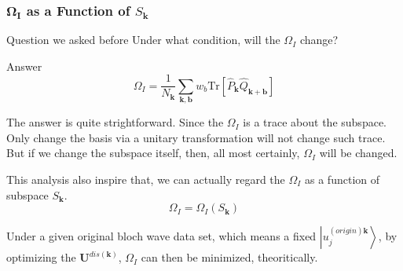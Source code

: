 \documentclass{beamer}
\begin{document}
  \begin{frame}
    \frametitle{\(\mathbf{\Omega_I}\) as a Function of \(S_\mathbf{k}\)}

    \begin{alertblock}{Question we asked before}
      Under what condition, will the \(\Omega_I\) change?
    \end{alertblock}
    
    \begin{block}{Answer}
      \small
      \begin{equation*}
        \Omega_I = \dfrac{1}{N_\mathbf{k}}\sum_{\mathbf{k},\mathbf{b}}w_b{}\mathrm{Tr}\left[\widehat{P}_{\mathbf{k}}\widehat{Q}_{\mathbf{k}+\mathbf{b}} \right]
      \end{equation*}
      
      The answer is quite strightforward. Since the \(\Omega_I\) is a trace about the subspace. Only change the basis via a unitary transformation will not change such trace. But if we change the subspace itself, then, all most certainly, \(\Omega_I\) will be changed.

      This analysis also inspire that, {\color{purple} we can actually regard the \(\Omega_I\) as a function of subspace \(S_\mathbf{k}\).}
      \begin{equation*}
        \Omega_I = \Omega_I(S_\mathbf{k})
      \end{equation*}

      Under a given original bloch wave data set, which means a fixed \(\left|u_j^{(origin)\mathbf{k}}\right\rangle\), by optimizing the \(\mathbf{U}^{dis(\mathbf{k})}\), \(\Omega_I\) can then be minimized, theoritically. 
    \end{block}

  \end{frame}
\end{document}
